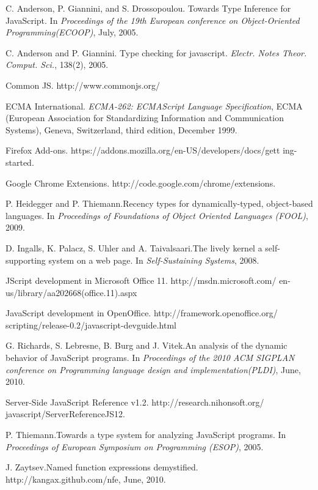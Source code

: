 \documentclass[10pt, preprint]{sigplanconf}
\begin{document}
\begin{thebibliography}{}
\softraggedright


C. Anderson, P. Giannini, and S. Drossopoulou. \newblock Towards Type Inference for JavaScript.
\newblock In \emph{Proceedings of the 19th European conference on Object-Oriented Programming(ECOOP)},
July, 2005.

C. Anderson and P. Giannini. \newblock Type checking for javascript.
\newblock \emph{Electr. Notes Theor. Comput. Sci.}, 138(2), 2005. 

Common JS.
\newblock http://www.commonjs.org/

ECMA International.
\newblock \emph{ECMA-262: ECMAScript Language Specification},
ECMA (European Association for Standardizing Information
and Communication Systems), Geneva, Switzerland, third edition,
December 1999. 

Firefox Add-ons.
\newblock https://addons.mozilla.org/en-US/developers/docs/gett ing-started.

Google Chrome Extensions.
\newblock http://code.google.com/chrome/extensions.

P. Heidegger and P. Thiemann.\newblock Recency types for dynamically-typed, object-based languages.
\newblock In \emph{Proceedings of Foundations of Object Oriented Languages (FOOL)},
2009.

D. Ingalls, K. Palacz, S. Uhler and A. Taivalsaari.\newblock The lively kernel a self-supporting system on
a web page.
\newblock In \emph{Self-Sustaining Systems},
2008.

JScript development in Microsoft Office 11.
\newblock http://msdn.microsoft.com/ en-us/library/aa202668(office.11).aspx

JavaScript development in OpenOffice.
\newblock http://framework.openoffice.org/ scripting/release-0.2/javascript-devguide.html

G. Richards, S. Lebresne, B. Burg and J. Vitek.\newblock An analysis of the dynamic behavior of JavaScript programs.
\newblock In \emph{Proceedings of the 2010 ACM SIGPLAN conference on Programming language design and implementation(PLDI)},
June, 2010.

Server-Side JavaScript Reference v1.2.
\newblock http://research.nihonsoft.org/ javascript/ServerReferenceJS12.

P. Thiemann.\newblock Towards a type system for analyzing JavaScript programs.
\newblock In \emph{Proceedings of European Symposium on Programming (ESOP)},
2005.

J. Zaytsev.\newblock Named function expressions demystified.
\newblock http://kangax.github.com/nfe,
June, 2010.


\end{thebibliography}
\end{document}
